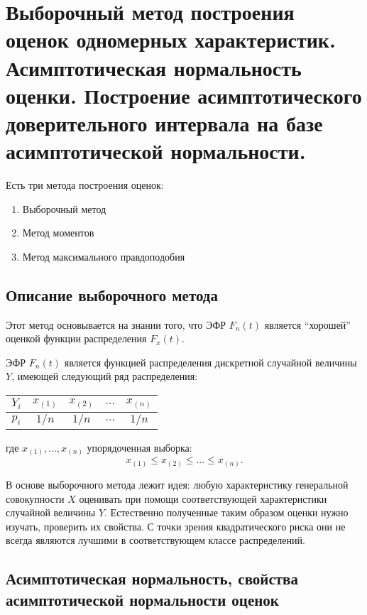 \section{Выборочный метод построения оценок одномерных характеристик.
Асимптотическая нормальность оценки. Построение асимптотического доверительного
интервала на базе асимптотической нормальности.}

Есть три метода построения оценок:
\begin{enumerate}
  \item Выборочный метод
  \item Метод моментов
  \item Метод максимального правдоподобия
\end{enumerate}


\subsection{Описание выборочного метода}
Этот метод основывается на знании того, что ЭФР $F_n(t)$ является ``хорошей''
оценкой функции распределения $F_x(t)$.

ЭФР $F_n(t)$ является функцией распределения дискретной случайной величины
$Y$, имеющей следующий ряд распределения:


\begin{center}
\begin{tabular}{ c|c|c|c|c }
  $Y_i$ & $x_{(1)}$ & $x_{(2)}$ & $...$ & $x_{(n)}$ \\
 \hline
 $p_i$ & $1/n$ & $1/n$ & $...$ & $1/n$ \\
\end{tabular}
\end{center}

где $x_{(1)}, ..., x_{(n)}$ упорядоченная выборка:
\[
  x_{(1)} \leqslant x_{(2)} \leqslant ... \leqslant x_{(n)}
.\]

В основе выборочного метода лежит идея:
любую характеристику генеральной совокупности $X$ оценивать при помощи соответствующей характеристики случайной величины $Y$. Естественно полученные таким образом оценки нужно изучать, проверить их свойства. С точки зрения квадратического риска они не всегда являются лучшими в соответствующем классе распределений.

\subsection{Асимптотическая нормальность, свойства асимптотической нормальности оценок}

